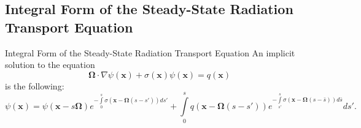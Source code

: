 \subsection{Integral Form of the Steady-State Radiation Transport Equation}
\begin{theorem}{Integral Form of the Steady-State Radiation Transport Equation}{}
   An implicit solution to the equation
   \begin{equation}\label{PDEss}
      \mathbf{\Omega}\cdot\nabla\psi(\mathbf{x})
      + \sigma(\mathbf{x})\psi(\mathbf{x}) = q(\mathbf{x})
   \end{equation}
   is the following:
   \begin{equation}\label{exactss}
      \psi(\mathbf{x}) = \psi(\mathbf{x} - s\mathbf{\Omega})
         e^{-\int\limits_0^s \sigma(\mathbf{x} - \mathbf{\Omega}(s -s'))ds'} +
         \int\limits_0^s q(\mathbf{x} - \mathbf{\Omega}(s -s'))
         e^{-\int\limits_{s'}^s\sigma(\mathbf{x}
         - \mathbf{\Omega}(s -\bar{s}))d\bar{s}} ds'.
   \end{equation}
\end{theorem}

